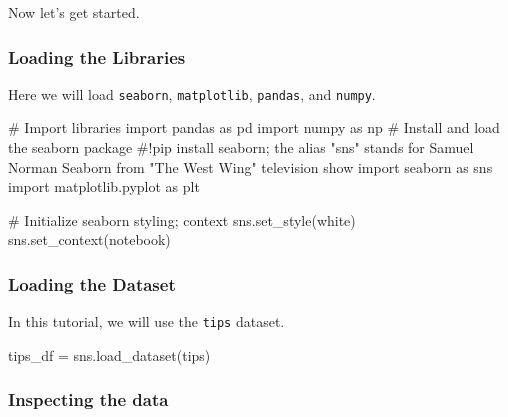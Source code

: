 \documentclass[
  letterpaper,
  DIV=11,
  numbers=noendperiod]{scrartcl}
\newenvironment{Shaded}{\begin{snugshade}}{\end{snugshade}}
\newcommand{\CommentTok}[1]{\textcolor[rgb]{0.37,0.37,0.37}{#1}}
\newcommand{\ImportTok}[1]{\textcolor[rgb]{0.00,0.46,0.62}{#1}}
\newcommand{\NormalTok}[1]{\textcolor[rgb]{0.00,0.46,0.62}{#1}}
\newcommand{\OperatorTok}[1]{\textcolor[rgb]{0.37,0.37,0.37}{#1}}
\newcommand{\StringTok}[1]{\textcolor[rgb]{0.13,0.47,0.30}{#1}}
\begin{document}
Now let's get started.

\hypertarget{loading-the-libraries}{%
\subsubsection{Loading the Libraries}\label{loading-the-libraries}}

Here we will load \texttt{seaborn}, \texttt{matplotlib},
\texttt{pandas}, and \texttt{numpy}.

\begin{Shaded}
\begin{Highlighting}[]
\CommentTok{\# Import libraries}
\ImportTok{import}\NormalTok{ pandas }\ImportTok{as}\NormalTok{ pd}
\ImportTok{import}\NormalTok{ numpy }\ImportTok{as}\NormalTok{ np}
\CommentTok{\# Install and load the seaborn package}
\CommentTok{\#!pip install seaborn; the alias "sns" stands for Samuel Norman Seaborn from "The West Wing" television show}
\ImportTok{import}\NormalTok{ seaborn }\ImportTok{as}\NormalTok{ sns}
\ImportTok{import}\NormalTok{ matplotlib.pyplot }\ImportTok{as}\NormalTok{ plt}

\CommentTok{\# Initialize seaborn styling; context}
\NormalTok{sns.set\_style(}\StringTok{\textquotesingle{}white\textquotesingle{}}\NormalTok{)}
\NormalTok{sns.set\_context(}\StringTok{\textquotesingle{}notebook\textquotesingle{}}\NormalTok{)}
\end{Highlighting}
\end{Shaded}

\hypertarget{loading-the-dataset}{%
\subsubsection{Loading the Dataset}\label{loading-the-dataset}}

In this tutorial, we will use the \texttt{tips} dataset.

\begin{Shaded}
\begin{Highlighting}[]
\NormalTok{tips\_df }\OperatorTok{=}\NormalTok{ sns.load\_dataset(}\StringTok{\textquotesingle{}tips\textquotesingle{}}\NormalTok{)}
\end{Highlighting}
\end{Shaded}

\hypertarget{inspecting-the-data}{%
\subsubsection{Inspecting the data}\label{inspecting-the-data}}
\end{document}
